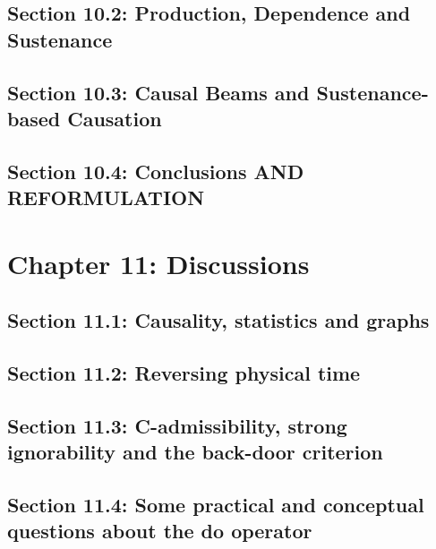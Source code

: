 \documentclass[oneside]{book}
\begin{document}


\section{Section 10.2: Production, Dependence and Sustenance}



\section{Section 10.3: Causal Beams and Sustenance-based Causation}



\section{Section 10.4: Conclusions AND REFORMULATION}



\chapter{Chapter 11: Discussions}

\section{Section 11.1: Causality, statistics and graphs}



\section{Section 11.2: Reversing physical time}



\section{Section 11.3: C-admissibility, strong ignorability and the back-door criterion}



\section{Section 11.4: Some practical and conceptual questions about the do operator}


\end{document}
